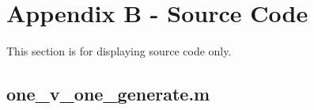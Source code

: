 \documentclass[a4paper, 10pt, conference]{ieeeconf}
\begin{document}




\section{Appendix B - Source Code}

This section is for displaying source code only.\\
\subsection*{one\_v\_one\_generate.m}

\end{document}
